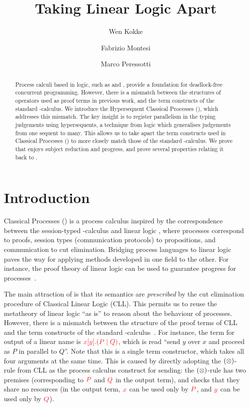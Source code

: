 \documentclass[draft,submission,copyright,creativecommons]{eptcs}
\title{Taking Linear Logic Apart}
\author{%
  Wen Kokke
  \institute{University of Edinburgh\\ Edinburgh, Scotland}
  \email{wen.kokke@ed.ac.uk}
  \and
  Fabrizio Montesi
  \institute{University of Southern Denmark\\ Odense, Denmark}
  \email{fmontesi@imada.sdu.dk}
  \and
  Marco Peressotti
  \institute{University of Southern Denmark\\ Odense, Denmark}
  \email{peressotti@imada.sdu.dk}}
\begin{document}
\maketitle

\begin{abstract}
  Process calculi based in logic, such as \piDILL and \cp, provide a foundation
  for deadlock-free concurrent programming.
  However, there is a mismatch between the structures of operators used as proof
  terms in previous work, and the term constructs of the standard \textpi-calculus.
  We introduce the Hypersequent Classical Processes (\hcp), which addresses this
  mismatch.
  The key insight is to register parallelism in the typing judgements using
  hypersequents, a technique from logic which generalises judgements from one
  sequent to many.
  This allows us to take apart the term constructs used in Classical Processes
  (\cp) to more closely match those of the standard \textpi-calculus.
  We prove that \hcp enjoys subject reduction and progress, and prove several
  properties relating it back to \cp.
\end{abstract}

\section{Introduction}
\label{sec:introduction}

Classical Processes (\cp) \cite{wadler2012} is a process calculus inspired by the correspondence between the session-typed \textpi-calculus and linear logic \cite{caires2010}, where processes correspond to proofs, session types (communication protocols) to propositions, and communication to cut elimination. Bridging process languages to linear logic paves the way for applying methods developed in one field to the other. For instance, the proof theory of linear logic can be used to guarantee progress for processes~\cite{caires2010,wadler2012}.

The main attraction of \cp is that its semantics are \emph{prescribed} by the cut elimination procedure of Classical Linear Logic (CLL). This permits us to reuse the metatheory of linear logic ``as is'' to reason about the behaviour of processes. However, there is a mismatch between the structure of the proof terms of CLL and the term constructs of the standard \textpi-calculus~\cite{milner1992a,milner1992b}. For instance, the term for output of a linear name is $\tm{\cpSend{x}{y}{P}{Q}}$, which is read ``send $y$ over $x$ and proceed as $P$ in parallel to $Q$''. Note that this is a single term constructor, which takes all four arguments at the same time. This is caused by directly adopting the $(\otimes)$-rule from CLL as the process calculus construct for sending: the $(\otimes)$-rule has two premises (corresponding to $\tm P$ and $\tm Q$ in the output term), and checks that they share no resources (in the output term, $\tm x$ can be used only by $\tm P$, and $\tm y$ can be used only by $\tm Q$).
\end{document}
